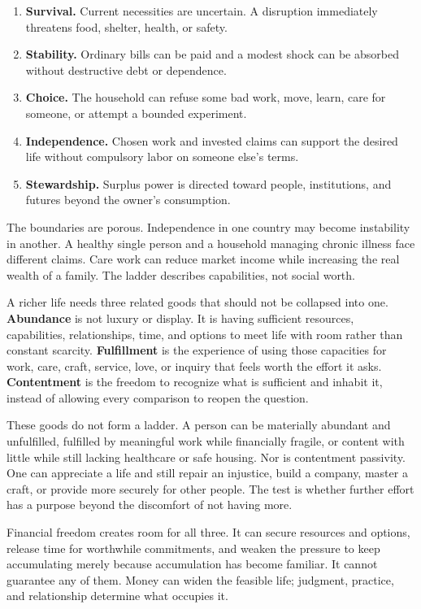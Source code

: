 \begin{enumerate}
\item \textbf{Survival.} Current necessities are uncertain. A disruption
  immediately threatens food, shelter, health, or safety.
\item \textbf{Stability.} Ordinary bills can be paid and a modest shock can be
  absorbed without destructive debt or dependence.
\item \textbf{Choice.} The household can refuse some bad work, move, learn,
  care for someone, or attempt a bounded experiment.
\item \textbf{Independence.} Chosen work and invested claims can support the
  desired life without compulsory labor on someone else's terms.
\item \textbf{Stewardship.} Surplus power is directed toward people, institutions,
  and futures beyond the owner's consumption.
\end{enumerate}

The boundaries are porous. Independence in one country may become instability
in another. A healthy single person and a household managing chronic illness
face different claims. Care work can reduce market income while increasing the
real wealth of a family. The ladder describes capabilities, not social worth.

A richer life needs three related goods that should not be collapsed into one.
\textbf{Abundance} is not luxury or display. It is having sufficient resources,
capabilities, relationships, time, and options to meet life with room rather
than constant scarcity. \textbf{Fulfillment} is the experience of using those
capacities for work, care, craft, service, love, or inquiry that feels worth the
effort it asks. \textbf{Contentment} is the freedom to recognize what is
sufficient and inhabit it, instead of allowing every comparison to reopen the
question.

These goods do not form a ladder. A person can be materially abundant and
unfulfilled, fulfilled by meaningful work while financially fragile, or
content with little while still lacking healthcare or safe housing. Nor is
contentment passivity. One can appreciate a life and still repair an injustice,
build a company, master a craft, or provide more securely for other people.
The test is whether further effort has a purpose beyond the discomfort of not
having more.

Financial freedom creates room for all three. It can secure resources and
options, release time for worthwhile commitments, and weaken the pressure to
keep accumulating merely because accumulation has become familiar. It cannot
guarantee any of them. Money can widen the feasible life; judgment, practice,
and relationship determine what occupies it.

